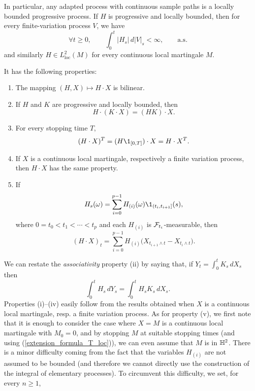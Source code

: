 \documentclass[../Main.tex]{subfiles}
\begin{document}
In particular, any adapted process with continuous sample paths is a locally bounded progressive process. If $H$ is progressive and locally bounded, then for every finite-variation process $V$, we have
$$
\forall t\ge 0,\qquad \int_0^t |H_s|\,d|V|_s<\infty,
\qquad \text{a.s.}
$$
and similarly $H\in L^2_{\mathrm{loc}}(M)$ for every continuous local
martingale $M$.

It has the following properties:
\begin{enumerate}
    \item The mapping $(H,X)\mapsto H\cdot X$ is bilinear.
    \item If $H$ and $K$ are progressive and locally bounded, then
    \[
    H\cdot(K\cdot X)=(HK)\cdot X.
    \]
    \item For every stopping time $T$,
    \[
    (H\cdot X)^T=(H\1_{[0,T]})\cdot X=H\cdot X^T.
    \]
    \item If $X$ is a continuous local martingale, respectively a finite
    variation process, then $H\cdot X$ has the same property.
    \item If
    \[
    H_s(\omega)=\sum_{i=0}^{p-1}H_{(i)}(\omega)
    \1_{(t_i,t_{i+1}]}(s),
    \]
    where $0=t_0<t_1<\cdots<t_p$ and each $H_{(i)}$ is
    $\mathcal{F}_{t_i}$-measurable, then
    \[
    (H\cdot X)_t=\sum_{i=0}^{p-1}H_{(i)}
    \bigl(X_{t_{i+1}\wedge t}-X_{t_i\wedge t}\bigr).
    \]
\end{enumerate}
We can restate the \textit{associativity} property (ii) by saying that, if $Y_t = \int_0^t K_s \, dX_s$ then $$\int_0^t H_s \, dY_s = \int_0^t H_s K_s \, dX_s.$$
Properties (i)–(iv) easily follow from the results obtained when $X$ is a continuous local martingale, resp. a finite variation process. As for property (v), we first note that it is enough to consider the case where $X = M$ is a continuous local martingale with $M_0 = 0$, and by stopping $M$ at suitable stopping times (and using (\ref{extension_formula_T_loc})), we can even assume that $M$ is in $\mathbb{H}^2$. There is a minor difficulty coming from the fact that the variables $H_{(i)}$ are not assumed to be bounded (and therefore we cannot directly use the construction of the integral of elementary processes). To circumvent this difficulty, we set, for every $n \ge 1$,
\end{document}
